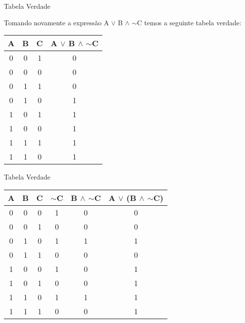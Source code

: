 \begin{frame}{Tabela Verdade}

Tomando novamente a expressão A $\vee$ B $\wedge$ $\sim$C temos a seguinte tabela verdade:

		\begin{center}
		\begin{tabular}{|c|c|c|c|} \hline 
			\textbf{A} & \textbf{B} & \textbf{C} & \textbf{A $\vee$ B $\wedge$ $\sim$C} \\ \hline 
			0 & 0 & 1 & 0 \\ \hline 
			0 & 0 & 0 & 0 \\ \hline 
			0 & 1 & 1 & 0 \\ \hline 
			0 & 1 & 0 & 1 \\ \hline 
			1 & 0 & 1 & 1 \\ \hline 
			1 & 0 & 0 & 1 \\ \hline 
			1 & 1 & 1 & 1 \\ \hline 
			1 & 1 & 0 & 1 \\ \hline 
		\end{tabular} 
		\end{center}

\end{frame}





\begin{frame}{Tabela Verdade}


		\begin{center}
		\begin{tabular}{|c|c|c||c||c||c|} \hline 
			\textbf{A} & \textbf{B} & \textbf{C} & 
			\textbf{$\sim$C} &
			\textbf{B $\wedge$ $\sim$C } &
			\textbf{A $\vee$ (B $\wedge$ $\sim$C)}
			\\ \hline 
			0 & 0 & 0 & 1 & 0 & 0 \\ \hline 
			0 & 0 & 1 & 0 & 0 & 0 \\ \hline 
			0 & 1 & 0 & 1 & 1 & 1 \\ \hline 
			0 & 1 & 1 & 0 & 0 & 0 \\ \hline 
			1 & 0 & 0 & 1 & 0 & 1 \\ \hline 
			1 & 0 & 1 & 0 & 0 & 1 \\ \hline 
			1 & 1 & 0 & 1 & 1 & 1 \\ \hline 
			1 & 1 & 1 & 0 & 0 & 1 \\ \hline 
		\end{tabular} 
		\end{center}

\end{frame}







